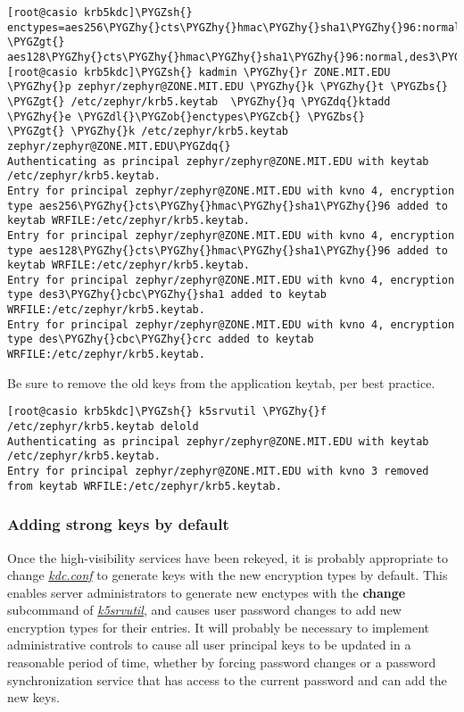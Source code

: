 \documentclass[letterpaper,10pt,english]{sphinxmanual}
\def\PYGZbs{\char`\\}
\def\PYGZob{\char`\{}
\def\PYGZcb{\char`\}}
\def\PYGZgt{\char`\>}
\def\PYGZsh{\char`\#}
\def\PYGZdl{\char`\$}
\def\PYGZhy{\char`\-}
\def\PYGZdq{\char`\"}
\begin{document}
\begin{Verbatim}[commandchars=\\\{\}]
[root@casio krb5kdc]\PYGZsh{} enctypes=aes256\PYGZhy{}cts\PYGZhy{}hmac\PYGZhy{}sha1\PYGZhy{}96:normal,\PYGZbs{}
\PYGZgt{} aes128\PYGZhy{}cts\PYGZhy{}hmac\PYGZhy{}sha1\PYGZhy{}96:normal,des3\PYGZhy{}cbc\PYGZhy{}sha1:normal,des\PYGZhy{}cbc\PYGZhy{}crc:normal
[root@casio krb5kdc]\PYGZsh{} kadmin \PYGZhy{}r ZONE.MIT.EDU \PYGZhy{}p zephyr/zephyr@ZONE.MIT.EDU \PYGZhy{}k \PYGZhy{}t \PYGZbs{}
\PYGZgt{} /etc/zephyr/krb5.keytab  \PYGZhy{}q \PYGZdq{}ktadd \PYGZhy{}e \PYGZdl{}\PYGZob{}enctypes\PYGZcb{} \PYGZbs{}
\PYGZgt{} \PYGZhy{}k /etc/zephyr/krb5.keytab zephyr/zephyr@ZONE.MIT.EDU\PYGZdq{}
Authenticating as principal zephyr/zephyr@ZONE.MIT.EDU with keytab /etc/zephyr/krb5.keytab.
Entry for principal zephyr/zephyr@ZONE.MIT.EDU with kvno 4, encryption type aes256\PYGZhy{}cts\PYGZhy{}hmac\PYGZhy{}sha1\PYGZhy{}96 added to keytab WRFILE:/etc/zephyr/krb5.keytab.
Entry for principal zephyr/zephyr@ZONE.MIT.EDU with kvno 4, encryption type aes128\PYGZhy{}cts\PYGZhy{}hmac\PYGZhy{}sha1\PYGZhy{}96 added to keytab WRFILE:/etc/zephyr/krb5.keytab.
Entry for principal zephyr/zephyr@ZONE.MIT.EDU with kvno 4, encryption type des3\PYGZhy{}cbc\PYGZhy{}sha1 added to keytab WRFILE:/etc/zephyr/krb5.keytab.
Entry for principal zephyr/zephyr@ZONE.MIT.EDU with kvno 4, encryption type des\PYGZhy{}cbc\PYGZhy{}crc added to keytab WRFILE:/etc/zephyr/krb5.keytab.
\end{Verbatim}

Be sure to remove the old keys from the application keytab, per best
practice.

\begin{Verbatim}[commandchars=\\\{\}]
[root@casio krb5kdc]\PYGZsh{} k5srvutil \PYGZhy{}f /etc/zephyr/krb5.keytab delold
Authenticating as principal zephyr/zephyr@ZONE.MIT.EDU with keytab /etc/zephyr/krb5.keytab.
Entry for principal zephyr/zephyr@ZONE.MIT.EDU with kvno 3 removed from keytab WRFILE:/etc/zephyr/krb5.keytab.
\end{Verbatim}


\subsubsection{Adding strong keys by default}
\label{admin/advanced/retiring-des:adding-strong-keys-by-default}
Once the high-visibility services have been rekeyed, it is probably
appropriate to change {\hyperref[admin/conf_files/kdc_conf:kdc-conf-5]{\emph{kdc.conf}}} to generate keys with the new
encryption types by default.  This enables server administrators to generate
new enctypes with the \textbf{change} subcommand of {\hyperref[admin/admin_commands/k5srvutil:k5srvutil-1]{\emph{k5srvutil}}},
and causes user password
changes to add new encryption types for their entries.  It will probably
be necessary to implement administrative controls to cause all user
principal keys to be updated in a reasonable period of time, whether
by forcing password changes or a password synchronization service that
has access to the current password and can add the new keys.
\end{document}
